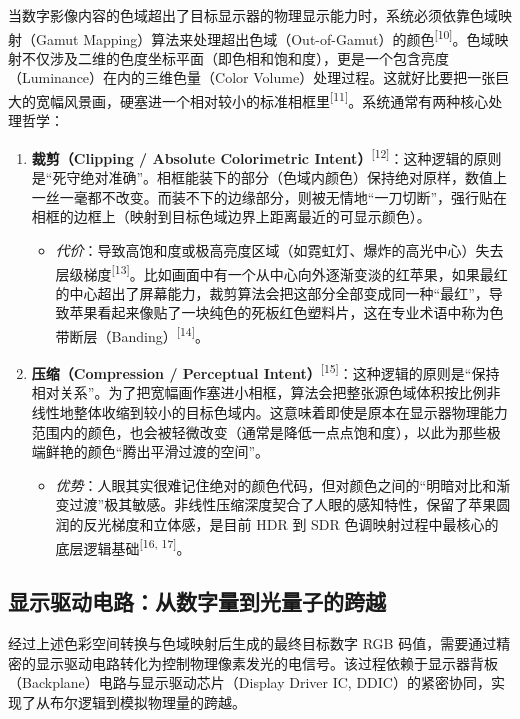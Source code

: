 \documentclass[12pt, a4paper]{ctexart}
\newcommand{\scite}[1]{\textsuperscript{[#1]}}
\begin{document}
当数字影像内容的色域超出了目标显示器的物理显示能力时，系统必须依靠色域映射（Gamut Mapping）算法来处理超出色域（Out-of-Gamut）的颜色\scite{10}。色域映射不仅涉及二维的色度坐标平面（即色相和饱和度），更是一个包含亮度（Luminance）在内的三维色量（Color Volume）处理过程。这就好比要把一张巨大的宽幅风景画，硬塞进一个相对较小的标准相框里\scite{11}。系统通常有两种核心处理哲学：

\begin{enumerate}
    \item \textbf{裁剪（Clipping / Absolute Colorimetric Intent）}\scite{12}：这种逻辑的原则是“死守绝对准确”。相框能装下的部分（色域内颜色）保持绝对原样，数值上一丝一毫都不改变。而装不下的边缘部分，则被无情地“一刀切断”，强行贴在相框的边框上（映射到目标色域边界上距离最近的可显示颜色）。
    \begin{itemize}
        \item \textit{代价}：导致高饱和度或极高亮度区域（如霓虹灯、爆炸的高光中心）失去层级梯度\scite{13}。比如画面中有一个从中心向外逐渐变淡的红苹果，如果最红的中心超出了屏幕能力，裁剪算法会把这部分全部变成同一种“最红”，导致苹果看起来像贴了一块纯色的死板红色塑料片，这在专业术语中称为色带断层（Banding）\scite{14}。
    \end{itemize}
    \item \textbf{压缩（Compression / Perceptual Intent）}\scite{15}：这种逻辑的原则是“保持相对关系”。为了把宽幅画作塞进小相框，算法会把整张源色域体积按比例非线性地整体收缩到较小的目标色域内。这意味着即使是原本在显示器物理能力范围内的颜色，也会被轻微改变（通常是降低一点点饱和度），以此为那些极端鲜艳的颜色“腾出平滑过渡的空间”。
    \begin{itemize}
        \item \textit{优势}：人眼其实很难记住绝对的颜色代码，但对颜色之间的“明暗对比和渐变过渡”极其敏感。非线性压缩深度契合了人眼的感知特性，保留了苹果圆润的反光梯度和立体感，是目前 HDR 到 SDR 色调映射过程中最核心的底层逻辑基础\scite{16, 17}。
    \end{itemize}
\end{enumerate}

\subsection{显示驱动电路：从数字量到光量子的跨越}

经过上述色彩空间转换与色域映射后生成的最终目标数字 RGB 码值，需要通过精密的显示驱动电路转化为控制物理像素发光的电信号。该过程依赖于显示器背板（Backplane）电路与显示驱动芯片（Display Driver IC, DDIC）的紧密协同，实现了从布尔逻辑到模拟物理量的跨越。
\end{document}

